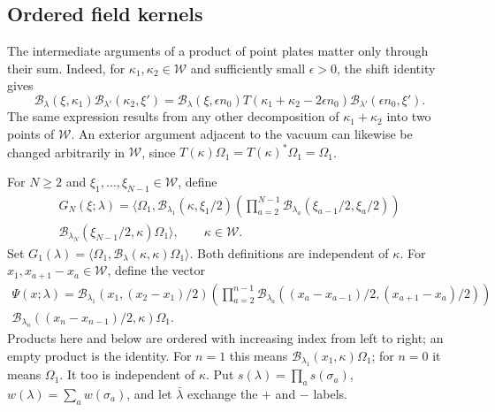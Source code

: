 \subsection{Ordered field kernels}\label{subsec:rotation-ordered-kernels}

The intermediate arguments of a product of point plates matter
only through their sum. Indeed, for $\kappa_1,\kappa_2\in\mathcal W$
and sufficiently small $\epsilon>0$, the shift identity gives
\[
 \mathcal B_\lambda(\xi,\kappa_1)
       \mathcal B_{\lambda'}(\kappa_2,\xi')
 =\mathcal B_\lambda(\xi,\epsilon n_0)
       T(\kappa_1+\kappa_2-2\epsilon n_0)
       \mathcal B_{\lambda'}(\epsilon n_0,\xi').
\]
The same expression results from any other decomposition of
$\kappa_1+\kappa_2$ into two points of $\mathcal W$.
An exterior argument adjacent to the vacuum can likewise be
changed arbitrarily in $\mathcal W$, since $T(\kappa)\Omega_1=
T(\kappa)^*\Omega_1=\Omega_1$.

For $N\ge2$ and $\xi_1,\ldots,\xi_{N-1}\in\mathcal W$, define
\begin{multline}\label{eq:rotation-ordered-kernel}
 G_N(\xi;\lambda)=
 \langle\Omega_1,\mathcal B_{\lambda_1}(\kappa,\xi_1/2)
       \left(\prod_{a=2}^{N-1}
          \mathcal B_{\lambda_a}(\xi_{a-1}/2,\xi_a/2)\right)\\
       \mathcal B_{\lambda_N}(\xi_{N-1}/2,\kappa)\Omega_1\rangle,
       \qquad\kappa\in\mathcal W.
\end{multline}
Set $G_1(\lambda)=\langle\Omega_1,
\mathcal B_\lambda(\kappa,\kappa)\Omega_1\rangle$.
Both definitions are independent of $\kappa$.
For $x_1,x_{a+1}-x_a\in\mathcal W$, define the vector
\begin{multline}\label{eq:rotation-ordered-vector}
 \Psi(x;\lambda)=
 \mathcal B_{\lambda_1}(x_1,(x_2-x_1)/2)
       \left(\prod_{a=2}^{n-1}
          \mathcal B_{\lambda_a}((x_a-x_{a-1})/2,(x_{a+1}-x_a)/2)\right)\\
       \mathcal B_{\lambda_n}((x_n-x_{n-1})/2,\kappa)\Omega_1.
\end{multline}
Products here and below are ordered with increasing index from
left to right; an empty product is the identity.
For $n=1$ this means
$\mathcal B_{\lambda_1}(x_1,\kappa)\Omega_1$; for $n=0$ it means
$\Omega_1$. It too is independent of $\kappa$.
Put $s(\lambda)=\prod_a s(\sigma_a)$, $w(\lambda)=\sum_a w(\sigma_a)$,
and let $\bar\lambda$ exchange the $+$ and $-$ labels.

